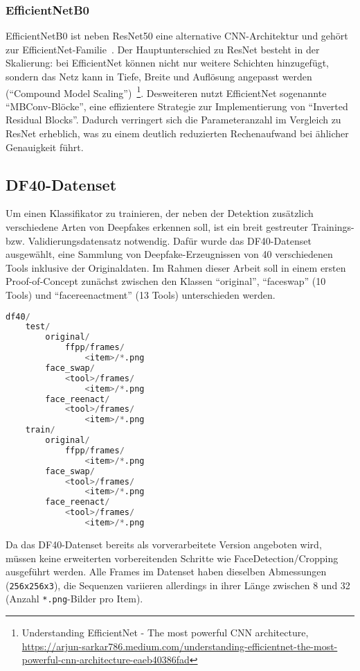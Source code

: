 \documentclass{article}
\newcommand{\resnet}{ResNet50\xspace}
\newcommand{\effnet}{EfficientNetB0\xspace}
\begin{document}
    \subsubsection{\effnet}
    \effnet ist neben \resnet eine alternative CNN-Architektur und gehört zur EfficientNet-Familie~\cite{efficientnet}.
    Der Hauptunterschied zu ResNet besteht in der Skalierung: bei EfficientNet können nicht nur weitere Schichten hinzugefügt, sondern das Netz kann in Tiefe, Breite und Auflösung angepasst werden (\enquote{Compound Model Scaling})~\footnote{Understanding EfficientNet - The most powerful CNN architecture, \url{https://arjun-sarkar786.medium.com/understanding-efficientnet-the-most-powerful-cnn-architecture-eaeb40386fad}}.
    Desweiteren nutzt EfficientNet sogenannte \enquote{MBConv-Blöcke}, eine effizientere Strategie zur Implementierung von \enquote{Inverted Residual Blocks}.
    Dadurch verringert sich die Parameteranzahl im Vergleich zu ResNet erheblich, was zu einem deutlich reduzierten Rechenaufwand bei ählicher Genauigkeit führt.
    \subsection{DF40-Datenset}
    Um einen Klassifikator zu trainieren, der neben der Detektion zusätzlich verschiedene Arten von Deepfakes erkennen soll, ist ein breit gestreuter Trainings- bzw. Validierungsdatensatz notwendig.
    Dafür wurde das DF40-Datenset~\cite{yan2024df40} ausgewählt, eine Sammlung von Deepfake-Erzeugnissen von 40 verschiedenen Tools inklusive der Originaldaten.
    Im Rahmen dieser Arbeit soll in einem ersten Proof-of-Concept zunächst zwischen den Klassen \enquote{original}, \enquote{faceswap} (10 Tools) und \enquote{facereenactment} (13 Tools) unterschieden werden.
    \begin{lstlisting}[language=Python,caption={Ordnerstruktur des DF40-Datensets im \enquote{io}-Verzeichnis}]
df40/
    test/
        original/
            ffpp/frames/
                <item>/*.png
        face_swap/
            <tool>/frames/
                <item>/*.png
        face_reenact/
            <tool>/frames/
                <item>/*.png
    train/
        original/
            ffpp/frames/
                <item>/*.png
        face_swap/
            <tool>/frames/
                <item>/*.png
        face_reenact/
            <tool>/frames/
                <item>/*.png
    \end{lstlisting}
    Da das DF40-Datenset bereits als vorverarbeitete Version angeboten wird, müssen keine erweiterten vorbereitenden Schritte wie FaceDetection/Cropping ausgeführt werden.
    Alle Frames im Datenset haben dieselben Abmessungen (\texttt{256x256x3}), die Sequenzen variieren allerdings in ihrer Länge zwischen 8 und 32 (Anzahl \texttt{*.png}-Bilder pro Item).
\end{document}
